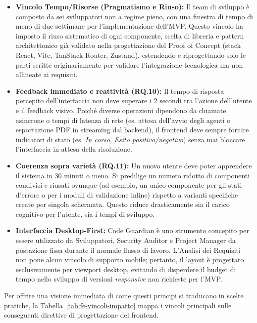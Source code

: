\documentclass[11pt,a4paper]{article}
\begin{document}
\begin{itemize}
    \item \textbf{Vincolo Tempo/Risorse (Pragmatismo e Riuso):} Il team di sviluppo è composto da sei sviluppatori non a regime pieno, con una finestra di tempo di meno di due settimane per l'implementazione dell'MVP. Questo vincolo ha imposto il riuso sistematico di ogni componente, scelta di libreria e pattern architettonico già validato nella progettazione del Proof of Concept (stack React, Vite, TanStack Router, Zustand), estendendo e riprogettando solo le parti scritte originariamente per validare l'integrazione tecnologica ma non allineate ai requisiti.
    \item \textbf{Feedback immediato e reattività (RQ.10):} Il tempo di risposta percepito dell'interfaccia non deve superare i 2 secondi tra l'azione dell'utente e il feedback visivo. Poiché diverse operazioni dipendono da chiamate asincrone o tempi di latenza di rete (es. attesa dell'avvio degli agenti o esportazione PDF in streaming dal backend), il frontend deve sempre fornire indicatori di stato (es. \emph{In corso}, \emph{Esito positivo/negativo}) senza mai bloccare l'interfaccia in attesa della risoluzione.
    \item \textbf{Coerenza sopra varietà (RQ.11):} Un nuovo utente deve poter apprendere il sistema in 30 minuti o meno. Si predilige un numero ridotto di componenti condivisi e riusati ovunque (ad esempio, un unico componente per gli stati d'errore o per i moduli di validazione inline) rispetto a varianti specifiche create per singola schermata. Questo riduce drasticamente sia il carico cognitivo per l'utente, sia i tempi di sviluppo.
    \item \textbf{Interfaccia Desktop-First:} Code Guardian è uno strumento concepito per essere utilizzato da Sviluppatori, Security Auditor e Project Manager da postazione fissa durante il normale flusso di lavoro. L'Analisi dei Requisiti non pone alcun vincolo di supporto mobile; pertanto, il layout è progettato esclusivamente per viewport desktop, evitando di disperdere il budget di tempo nello sviluppo di versioni \emph{responsive} non richieste per l'MVP.
\end{itemize}

Per offrire una visione immediata di come questi principi si traducano in scelte pratiche, la Tabella~\ref{tab:fe-vincoli-impatto} mappa i vincoli principali sulle conseguenti direttive di progettazione del frontend.
\end{document}
